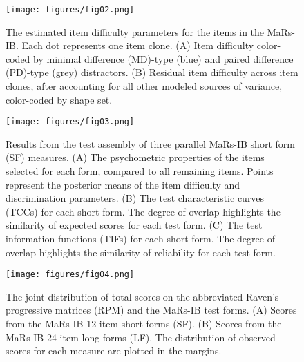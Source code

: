 \documentclass[a4paper,man,natbib]{apa6}
\begin{document}
\begin{figure}
\centering
\texttt{[image: figures/fig02.png]}
\caption{\label{fig:fig02} The estimated item difficulty parameters for the items in the MaRs-IB. Each dot represents one item clone. (A) Item difficulty color-coded by minimal difference (MD)-type (blue) and paired difference (PD)-type (grey) distractors. (B) Residual item difficulty across item clones, after accounting for all other modeled sources of variance, color-coded by shape set.}
\end{figure}
 
\begin{figure}
\centering
\texttt{[image: figures/fig03.png]}
\caption{\label{fig:fig03}Results from the test assembly of three parallel MaRs-IB short form (SF) measures. (A) The psychometric properties of the items selected for each form, compared to all remaining items. Points represent the posterior means of the item difficulty and discrimination  parameters. (B) The test characteristic curves (TCCs) for each short form. The degree of overlap highlights the similarity of expected scores for each test form. (C) The test information functions (TIFs) for each short form. The degree of overlap highlights the similarity of reliability for each test form.}
\end{figure}

\begin{figure}
\centering
\texttt{[image: figures/fig04.png]}
\caption{\label{fig:fig04}The joint distribution of total scores on the abbreviated Raven's progressive matrices (RPM) and the MaRs-IB test forms. (A) Scores from the MaRs-IB 12-item short forms (SF). (B) Scores from the MaRs-IB 24-item long forms (LF). The distribution of observed scores for each measure are plotted in the margins.}
\end{figure}
\end{document}
